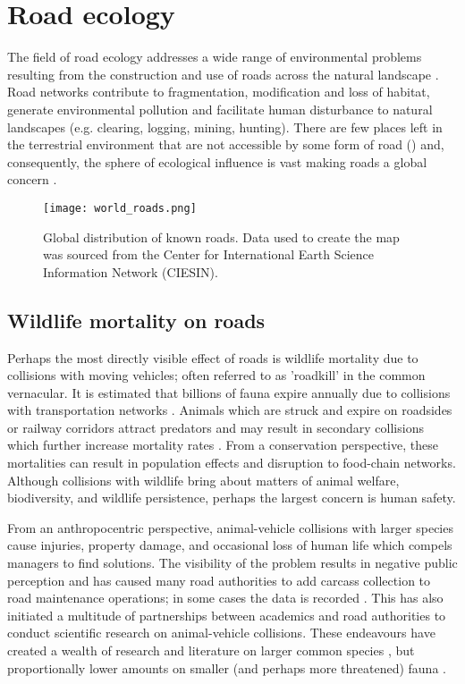 \section{Road ecology}

The field of road ecology addresses a wide range of environmental problems resulting from the construction and use of roads across the natural landscape \citep{form03,rvdr15}. Road networks contribute to fragmentation, modification and loss of habitat, generate environmental pollution and facilitate human disturbance to natural landscapes (e.g. clearing, logging, mining, hunting). There are few places left in the terrestrial environment that are not accessible by some form of road () and, consequently, the sphere of ecological influence is vast making roads a global concern \citep{laur14}.

\begin{figure*}[htp]
  \centering
  \texttt{[image: world\_roads.png]}
  \caption[Global distribution of known roads]{Global distribution of known roads. Data used to create the map was sourced from the Center for International Earth Science Information Network (CIESIN).}
  \label{roads}
\end{figure*}

\subsection{Wildlife mortality on roads}

Perhaps the most directly visible effect of roads is wildlife mortality due to collisions with moving vehicles; often referred to as 'roadkill' in the common vernacular.  It is estimated that billions of fauna expire annually due to collisions with transportation networks \citep{seil06}.  Animals which are struck and expire on roadsides or railway corridors attract predators and may result in secondary collisions which further increase mortality rates \citep{spel98}.  From a conservation perspective, these mortalities can result in population effects and disruption to food-chain networks.  Although collisions with wildlife bring about matters of animal welfare, biodiversity, and wildlife persistence, perhaps the largest concern is human safety. 

From an anthropocentric perspective, animal-vehicle collisions with larger species cause injuries, property damage, and occasional loss of human life which compels managers to find solutions. The visibility of the problem results in negative public perception and has caused many road authorities to add carcass collection to road maintenance operations; in some cases the data is recorded \citep{huij07a}. This has also initiated a multitude of partnerships between academics and road authorities to conduct scientific research on animal-vehicle collisions.  These endeavours have created a wealth of research and literature on larger common species \citep{biss08b,clev01,romi96,sudh09}, but proportionally lower amounts on smaller (and perhaps more threatened) fauna \citep{clev03}.

